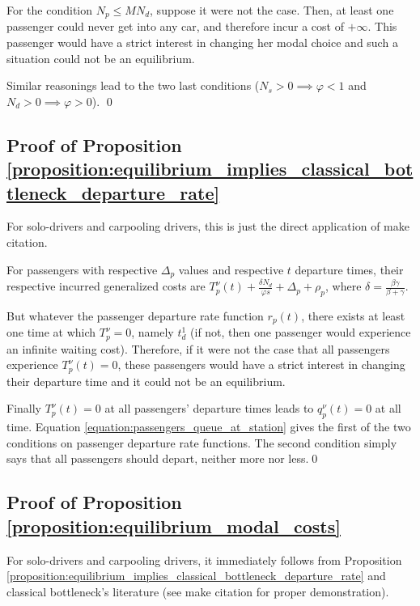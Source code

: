 \documentclass[english, a4paper]{article}
\theoremstyle{plain}
\theoremstyle{definition}
\theoremstyle{remark}
\begin{document}
For the condition $N_p \leq MN_d$, suppose it were not the case. Then, at least one passenger could never get into any car, and therefore incur a cost of $+\infty$. This passenger would have a strict interest in changing her modal choice and such a situation could not be an equilibrium.

Similar reasonings lead to the two last conditions ($N_s > 0 \implies \varphi < 1$ and $N_d > 0 \implies \varphi > 0$). \qed

\subsection{Proof of Proposition \ref{proposition:equilibrium_implies_classical_bottleneck_departure_rate}}
\label{proof:equilibrium_implies_classical_bottleneck_departure_rate}

For solo-drivers and carpooling drivers, this is just the direct application of \alert{make citation}.

For passengers with respective $\Delta_p$ values and respective $t$ departure times, their respective incurred generalized costs are $T_p^{\nu}(t) + \frac{\delta N_d}{\varphi s} + \Delta_p + \rho_p$, where $\delta = \frac{\beta\gamma}{\beta + \gamma}$.

But whatever the passenger departure rate function $r_p(t)$, there exists at least one time at which $T_p^\nu = 0$, namely $t_d^1$ (if not, then one passenger would experience an infinite waiting cost). Therefore, if it were not the case that all passengers experience $T_p^\nu(t) = 0$, these passengers would have a strict interest in changing their departure time and it could not be an equilibrium.

Finally $T_p^\nu(t) = 0$ at all passengers’ departure times leads to $q_p^\nu(t) = 0$ at all time. Equation \ref{equation:passengers_queue_at_station} gives the first of the two conditions on passenger departure rate functions. The second condition simply says that all passengers should depart, neither more nor less.\qed

\subsection{Proof of Proposition \ref{proposition:equilibrium_modal_costs}}
\label{proof:equilibrium_modal_costs}

For solo-drivers and carpooling drivers, it immediately follows from Proposition \ref{proposition:equilibrium_implies_classical_bottleneck_departure_rate} and classical bottleneck’s literature (see \alert{make citation} for proper demonstration).
    
\end{document}
